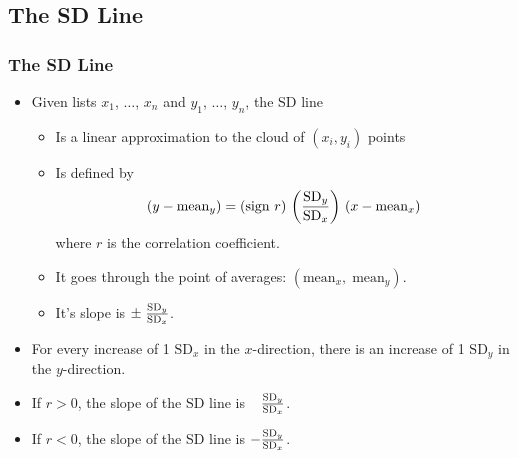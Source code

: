 \documentclass[t]{beamer}
\begin{document}
\subsection{The SD Line}
\begin{frame}[t]\frametitle{The SD Line}
{\small
\begin{itemize}
\item Given lists $x_1$, $\dots$, $x_n$ and $y_1$, $\dots$, $y_n$, the SD line  
   \begin{itemize}
   \item Is a linear approximation to the cloud of $(x_i, y_i)$ points
   \item Is defined by\vspace{-10pt}
\[\left(y - \mbox{mean}_y\right) = \left(\mbox{sign $r$}\right)\,
   \left(\frac{\mbox{SD}_y}{\mbox{SD}_x}\right)\,\left(x - \mbox{mean}_x\right)\vspace{-3pt}\]
 where $r$ is the  correlation coefficient.\vspace{2pt}
   \item It goes through the point of averages:  $(\mbox{mean}_x,\; \mbox{mean}_y)$.
   \item It's slope is $\pm\;\frac{\mbox{\scriptsize SD}_y}{\mbox{\scriptsize SD}_x}$.
   \end{itemize}
\item For every increase of 1 $\mbox{SD}_x$ in the $x$-direction, there is an increase of 1 
$\mbox{SD}_y$   in the $y$-direction.
\item If  $r>0$, the slope of the SD line is $\hphantom{-}
\frac{\mbox{\scriptsize SD}_y}{\mbox{\scriptsize SD}_x}$.
\item If  $r<0$, the slope of the SD line is $-\frac{\mbox{\scriptsize SD}_y}{\mbox{\scriptsize SD}_x}$.
\end{itemize}
}
\end{frame}
\end{document}
